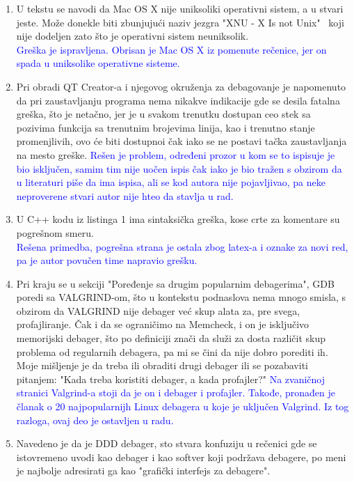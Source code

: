 \documentclass[a4paper]{report}
\newcommand{\odgovor}[1]{\textcolor{blue}{#1}}
\begin{document}
\begin{enumerate}
	\item U tekstu se navodi da Mac OS X nije uniksoliki operativni sistem, a u stvari jeste. Može donekle biti zbunjujući naziv jezgra "XNU - X Is not Unix" \ koji nije dodeljen zato što je operativni sistem neuniksolik.\\
	\odgovor{Greška je ispravljena. Obrisan je Mac OS X iz pomenute rečenice, jer on spada u uniksolike operativne sisteme.}
	\item Pri obradi QT Creator-a i njegovog okruženja za debagovanje je napomenuto da pri zaustavljanju programa nema nikakve indikacije gde se desila fatalna greška, što je netačno, jer je u svakom trenutku dostupan ceo stek sa pozivima funkcija sa trenutnim brojevima linija, kao i trenutno stanje promenjlivih, ovo će biti dostupnoi čak iako se ne postavi tačka zaustavljanja na mesto greške.
	\odgovor{Rešen je problem, određeni prozor u kom se to ispisuje je bio isključen, samim tim nije uočen ispis čak iako je bio tražen s obzirom da u literaturi piše da ima ispisa, ali se kod autora
	nije pojavljivao, pa neke neproverene stvari autor nije hteo da stavlja u rad.}
           \item U C++ kodu iz listinga 1 ima sintaksička greška, kose crte za komentare su pogrešnom smeru.  \\
	\odgovor{Rešena primedba, pogrešna strana je ostala zbog latex-a i oznake za novi red, pa je autor povučen time napravio grešku.}
	\item Pri kraju se u sekciji "Poređenje sa drugim popularnim debagerima", GDB poredi sa VALGRIND-om, što u kontekstu podnaslova nema mnogo smisla, s obzirom da VALGRIND nije debager već skup alata za, pre svega, profajliranje. Čak i da se ograničimo na Memcheck, i on je isključivo memorijski debager, što po definiciji znači da služi za dosta različit skup problema od regularnih debagera, pa mi se čini da nije dobro porediti ih. Moje mišljenje je da treba ili obraditi drugi debager ili se pozabaviti pitanjem: "Kada treba koristiti debager, a kada profajler?" 
	\odgovor{ Na zvaničnoj stranici Valgrind-a stoji da je on i debager i profajler. Takođe, pronađen je članak o 20 najpopularnijh Linux debagera u koje je uključen Valgrind. Iz tog razloga, ovaj deo je ostavljen u radu.}
	\item Navedeno je da je DDD debager, sto stvara konfuziju u rečenici gde se istovremeno uvodi kao debager i kao softver koji podržava debagere, po meni je najbolje adresirati ga kao "grafički interfejs za debagere". \\

\end{enumerate}
\end{document}
